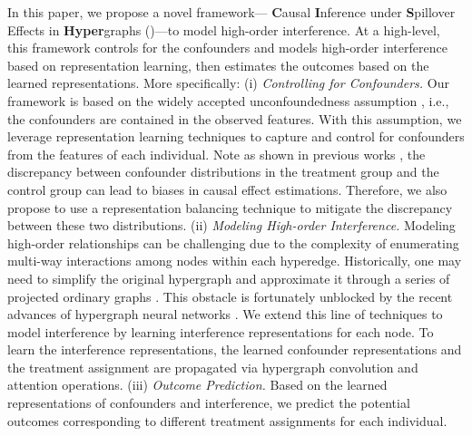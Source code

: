 In this paper, we propose a novel framework--- \textbf{C}ausal \textbf{I}nference under \textbf{S}pillover Effects in \textbf{Hyper}graphs (\textit{\mymodel})---to model high-order interference. At a high-level, 
this framework controls for the confounders and models high-order interference based on representation learning, then estimates the outcomes based on the learned representations. More specifically: (i) \emph{Controlling for Confounders.} Our framework is based on the widely accepted unconfoundedness assumption \cite{rubin1980randomization}, i.e., the confounders are contained in the observed features. With this assumption, we leverage representation learning techniques to capture and control for confounders from the features of each individual. Note as shown in previous works \cite{CFR}, the discrepancy between confounder distributions in the treatment group 
and the control group 
can lead to biases in causal effect estimations. Therefore, we also propose to use a representation balancing technique to mitigate the discrepancy between these two distributions.
(ii) \emph{Modeling High-order Interference.} Modeling high-order relationships can be challenging due to the complexity of enumerating multi-way interactions among nodes within each hyperedge. Historically, one may need to simplify the original hypergraph and approximate it through a series of projected ordinary graphs \cite{yoon2020much}. This obstacle is fortunately unblocked by the recent advances of hypergraph neural networks \cite{bai2021hypergraph,yadati2018hypergcn}. We extend this line of techniques to model interference by learning interference representations for each node. To learn the interference representations, the learned confounder representations and the treatment assignment are propagated via hypergraph convolution and attention operations. 
(iii) \emph{Outcome Prediction.} Based on the learned representations of confounders and interference, we predict the potential outcomes corresponding to different treatment assignments for each individual.
